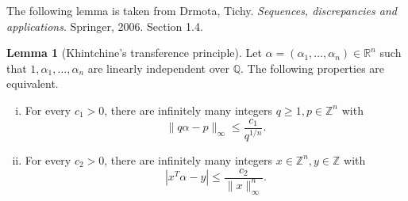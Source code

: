 \documentclass[12pt,a4paper]{article}
\theoremstyle{plain}
\theoremstyle{definition}
\newtheorem{lemma}[theorem]{Lemma}
\def \Q {\mathbb Q}
\def \R {\mathbb R}
\def \Z {\mathbb Z}
\begin{document}
The following lemma is taken from Drmota, Tichy.  \emph{Sequences, discrepancies and applications}. Springer, 2006. Section 1.4.
\begin{lemma}[Khintchine's transference principle]\label{lem:1}
	Let $\alpha = (\alpha_1, \dots, \alpha_n) \in \R^n$ such that $1, \alpha_1, \dots, \alpha_n$ are linearly independent over $\Q$.
	The following properties are equivalent.
	\begin{enumerate}[i)]
		\item For every $c_1 > 0$, there are infinitely many integers $q \geq 1, p \in \Z^n$ with
			\[ \| q \alpha - p \|_\infty \leq \frac{c_1}{q^{1/n}}. \]
		\item For every $c_2 > 0$, there are infinitely many integers $x \in \Z^n, y \in \Z$ with
			\[ | x^T \alpha - y | \leq \frac{c_2}{ \| x \|_\infty^n}. \]
	\end{enumerate}
\end{lemma}
\end{document}
